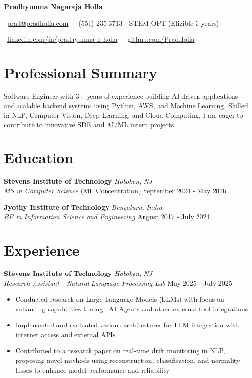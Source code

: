 \documentclass[10pt,a4paper]{article}
\newcommand{\headerfont}{\sffamily\bfseries}  %
\newcommand{\headername}[1]{{\fontsize{14}{17}\headerfont #1}}
\begin{document}

\begin{center}
    \headername{Pradhyumna Nagaraja Holla}
    
    {\faEnvelope\ \href{mailto:prad@pradholla.com}{prad@pradholla.com} 
    \,\textbullet\, 
    \faPhone\ (551) 235-3713 
    \,\textbullet\, 
    STEM OPT (Eligible 3-years)}
    
    {\faLinkedin\ \href{https://www.linkedin.com/in/pradhyumna-n-holla/}{linkedin.com/in/pradhyumna-n-holla} 
    \,\textbullet\, 
    \faGithub\ \href{https://github.com/PradHolla}{github.com/PradHolla}}
\end{center}

\section*{Professional Summary}
\begin{spacing}{1.0}
    Software Engineer with 3+ years of experience building AI-driven applications and scalable backend systems using Python, AWS, and Machine Learning. Skilled in NLP, Computer Vision, Deep Learning, and Cloud Computing, I am eager to contribute to innovative SDE and AI/ML intern projects.
\end{spacing}

\vspace{-0.2em}
\section*{Education}
\noindent\textbf{Stevens Institute of Technology} \hfill \textit{Hoboken, NJ}\\
\textit{MS in Computer Science} (ML Concentration) \hfill September 2024 - May 2026

\vspace{0.2em}
\noindent\textbf{Jyothy Institute of Technology} \hfill \textit{Bengaluru, India}\\
\textit{BE in Information Science and Engineering} \hfill August 2017 - July 2021

\section*{Experience}
\noindent\textbf{Stevens Institute of Technology} \hfill \textit{Hoboken, NJ}\\
\textit{Research Assistant - Natural Language Processing Lab} \hfill May 2025 - July 2025
\begin{itemize}
    \item Conducted research on Large Language Models (LLMs) with focus on enhancing capabilities through AI Agents and other external tool integrations
    \item Implemented and evaluated various architectures for LLM integration with internet access and external APIs
    \item Contributed to a research paper on real-time drift monitoring in NLP, proposing novel methods using reconstruction, classification, and normality losses to enhance model performance and reliability
\end{itemize}
\end{document}
